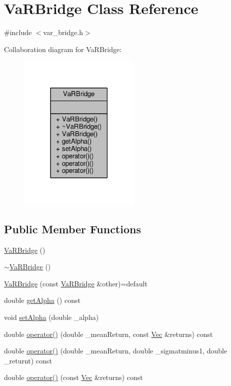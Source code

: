 \hypertarget{classVaRBridge}{}\section{Va\+R\+Bridge Class Reference}
\label{classVaRBridge}


{\ttfamily \#include $<$var\+\_\+bridge.\+h$>$}



Collaboration diagram for Va\+R\+Bridge\+:
\nopagebreak
\begin{figure}[H]
\begin{center}
\leavevmode
\includegraphics[width=165pt]{classVaRBridge__coll__graph}
\end{center}
\end{figure}
\subsection*{Public Member Functions}
\begin{DoxyCompactItemize}
\item 
\hyperlink{classVaRBridge_ae2a2b2437f30f28b3722a4634cc80161}{Va\+R\+Bridge} ()
\item 
\hyperlink{classVaRBridge_a876183182e5eb13a652627c69613963a}{$\sim$\+Va\+R\+Bridge} ()
\item 
\hyperlink{classVaRBridge_a2f83dff0248e044a116b4b063ca78b83}{Va\+R\+Bridge} (const \hyperlink{classVaRBridge}{Va\+R\+Bridge} \&other)=default
\item 
double \hyperlink{classVaRBridge_ab7bea293648bfa62762a3c61f162107e}{get\+Alpha} () const
\item 
void \hyperlink{classVaRBridge_a0101d9c9ee840f8720342f3639cd58dc}{set\+Alpha} (double \+\_\+alpha)
\item 
double \hyperlink{classVaRBridge_a64a2c30c69d03b4f75beb3087d3f1ea2}{operator()} (double \+\_\+mean\+Return, const \hyperlink{compute__returns__eigen_8h_a1eb6a9306ef406d7975f3cbf2e247777}{Vec} \&returns) const
\item 
double \hyperlink{classVaRBridge_ade75c664cc693524898fee6d66ae36b0}{operator()} (double \+\_\+mean\+Return, double \+\_\+sigmatminus1, double \+\_\+returnt) const
\item 
double \hyperlink{classVaRBridge_a4096da6ab396d3a92fc3423d08328bb0}{operator()} (const \hyperlink{compute__returns__eigen_8h_a1eb6a9306ef406d7975f3cbf2e247777}{Vec} \&returns) const
\end{DoxyCompactItemize}


